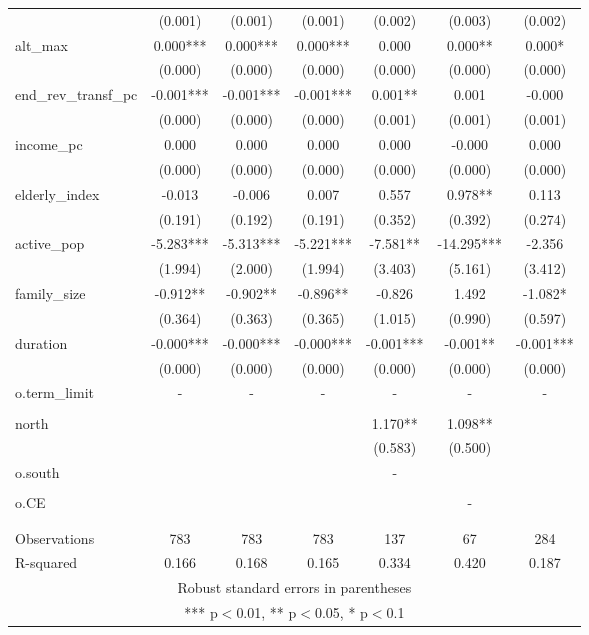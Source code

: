 \documentclass[]{article}
\begin{document}
\begin{tabular}{lcccccc}
 & (0.001) & (0.001) & (0.001) & (0.002) & (0.003) & (0.002) \\
alt\_max & 0.000*** & 0.000*** & 0.000*** & 0.000 & 0.000** & 0.000* \\
 & (0.000) & (0.000) & (0.000) & (0.000) & (0.000) & (0.000) \\
end\_rev\_transf\_pc & -0.001*** & -0.001*** & -0.001*** & 0.001** & 0.001 & -0.000 \\
 & (0.000) & (0.000) & (0.000) & (0.001) & (0.001) & (0.001) \\
income\_pc & 0.000 & 0.000 & 0.000 & 0.000 & -0.000 & 0.000 \\
 & (0.000) & (0.000) & (0.000) & (0.000) & (0.000) & (0.000) \\
elderly\_index & -0.013 & -0.006 & 0.007 & 0.557 & 0.978** & 0.113 \\
 & (0.191) & (0.192) & (0.191) & (0.352) & (0.392) & (0.274) \\
active\_pop & -5.283*** & -5.313*** & -5.221*** & -7.581** & -14.295*** & -2.356 \\
 & (1.994) & (2.000) & (1.994) & (3.403) & (5.161) & (3.412) \\
family\_size & -0.912** & -0.902** & -0.896** & -0.826 & 1.492 & -1.082* \\
 & (0.364) & (0.363) & (0.365) & (1.015) & (0.990) & (0.597) \\
duration & -0.000*** & -0.000*** & -0.000*** & -0.001*** & -0.001** & -0.001*** \\
 & (0.000) & (0.000) & (0.000) & (0.000) & (0.000) & (0.000) \\
o.term\_limit & - & - & - & - & - & - \\
 &  &  &  &  &  &  \\
north &  &  &  & 1.170** & 1.098** &  \\
 &  &  &  & (0.583) & (0.500) &  \\
o.south &  &  &  & - &  &  \\
 &  &  &  &  &  &  \\
o.CE &  &  &  &  & - &  \\
 &  &  &  &  &  &  \\
 &  &  &  &  &  &  \\
Observations & 783 & 783 & 783 & 137 & 67 & 284 \\
 R-squared & 0.166 & 0.168 & 0.165 & 0.334 & 0.420 & 0.187 \\ \hline
\multicolumn{7}{c}{ Robust standard errors in parentheses} \\
\multicolumn{7}{c}{ *** p$<$0.01, ** p$<$0.05, * p$<$0.1} \\
\end{tabular}
\end{document}

